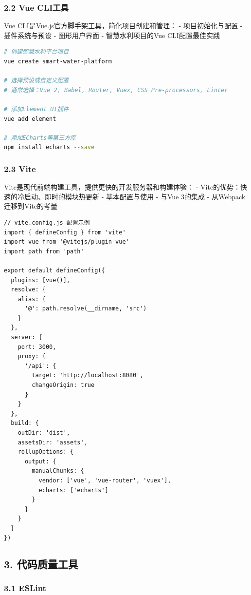 \subsubsection{2.2 Vue CLI工具}\label{vue-cliux5de5ux5177}

Vue CLI是Vue.js官方脚手架工具，简化项目创建和管理： - 项目初始化与配置 -
插件系统与预设 - 图形用户界面 - 智慧水利项目的Vue CLI配置最佳实践

\begin{lstlisting}[language=bash]
# 创建智慧水利平台项目
vue create smart-water-platform

# 选择预设或自定义配置
# 通常选择：Vue 2, Babel, Router, Vuex, CSS Pre-processors, Linter

# 添加Element UI插件
vue add element

# 添加ECharts等第三方库
npm install echarts --save
\end{lstlisting}

\subsubsection{2.3 Vite}\label{vite}

Vite是现代前端构建工具，提供更快的开发服务器和构建体验： -
Vite的优势：快速的冷启动、即时的模块热更新 - 基本配置与使用 - 与Vue
3的集成 - 从Webpack迁移到Vite的考量

\begin{lstlisting}
// vite.config.js 配置示例
import { defineConfig } from 'vite'
import vue from '@vitejs/plugin-vue'
import path from 'path'

export default defineConfig({
  plugins: [vue()],
  resolve: {
    alias: {
      '@': path.resolve(__dirname, 'src')
    }
  },
  server: {
    port: 3000,
    proxy: {
      '/api': {
        target: 'http://localhost:8080',
        changeOrigin: true
      }
    }
  },
  build: {
    outDir: 'dist',
    assetsDir: 'assets',
    rollupOptions: {
      output: {
        manualChunks: {
          vendor: ['vue', 'vue-router', 'vuex'],
          echarts: ['echarts']
        }
      }
    }
  }
})
\end{lstlisting}

\subsection{3. 代码质量工具}\label{ux4ee3ux7801ux8d28ux91cfux5de5ux5177}

\subsubsection{3.1 ESLint}\label{eslint}

